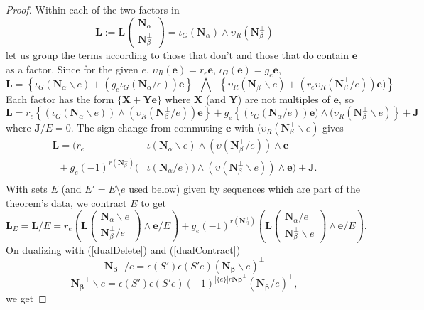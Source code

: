 \documentclass[Unicode]{cedram-alco}
\newcommand{\ext}[1]{\ensuremath{\mathbf{#1}}}
\newcommand{\eNal}{\ensuremath{\ext{N}_{\alpha}}}
\newcommand{\eNbePe}{\ensuremath{\ext{N}_{\beta}^{\perp}}}
\newcommand{\Is}{\ensuremath{\iota}}
\newcommand{\Vs}{\ensuremath{\upsilon}}
\begin{document}
\begin{proof}
Within each of the two factors in
  \[
   \ext{L} := \ext{L}\left( \begin{array}{c} \eNal\\ \eNbePe \end{array} \right)
=\Is_G(\eNal)\wedge\Vs_R(\eNbePe)
  \]
let us group the terms according to those that don't and those that do
contain $\ext{e}$ as a factor.   Since for the given $e$, 
  $\Vs_R(\ext{e})=r_e\ext{e}$, $\Is_G(\ext{e})=g_e\ext{e}$,
\[
\ext{L} =
\left\{\Is_G(\eNal \backslash e) + (g_e\Is_G(\eNal/e))\ext{e}\right\}
\;\;\bigwedge\;\;
\left\{\Vs_R(\eNbePe\backslash e) + (r_e\Vs_R(\eNbePe/e))\ext{e})\right\}  
\]
Each factor has the form $\{\ext{X} + \ext{Y}\ext{e}\}$ where
$\ext{X}$ (and $\ext{Y}$) are not multiples of $\ext{e}$, so
\[
\ext{L}=
r_e\left\{ (\Is_G(\eNal\backslash e))\wedge (\Vs_R(\eNbePe/e))\ext{e} \right\}  +
g_e\left\{ (\Is_G(\eNal/e))\ext{e})  \wedge (\Vs_R(\eNbePe\backslash e)\right\}
+\ext{J}
\]
where $\ext{J}/E = 0$.
The sign change from commuting $\ext{e}$ with $(\Vs_R(\eNbePe\backslash e)$ gives
\[
\begin{split} 
   \ext{L} = \Big( r_e  \;\;\; \;\;\;\;\;\;\;\;\;\;\;\;\;\; & \Is(\eNal\backslash e)  \wedge (\Vs(\eNbePe/e))      \wedge  \ext{e} \\
   \;\;+ g_e (-1)^{r(\eNbePe)} ( & \Is(\eNal/e))\wedge(\Vs(\eNbePe\backslash e))   \wedge  \ext{e}\Big)
+\ext{J}.\\
\end{split}
\]
With sets $E$ (and $E'=E\setminus e$ used below) given by sequences
which are part of the theorem's data, we contract $E$ to get
\[
\ext{L}_E=\ext{L}/E = r_e\left(\ext{L}\left(\begin{array}{c} \eNal\backslash e \\
    \eNbePe/e  \end{array} \right)  \wedge \ext{e} /E \right) +
   g_e(-1)^{r(\eNbePe)}\left(\ext{L}\left(\begin{array}{c} \eNal /e \\
    \eNbePe \backslash e \end{array} \right) \wedge \ext{e} /E \right).
   \]
On dualizing with (\ref{dualDelete}) and (\ref{dualContract})
   \[
     \ext{N_\beta}^\perp/e  = \epsilon(S')\epsilon(S'e) (\ext{N_\beta}\backslash e)^\perp
     \]
     \[
       \ext{N_\beta}^\perp\backslash e = \epsilon(S')\epsilon(S'e)(-1)^{|\{e\}|r\ext{N\beta}^\perp}(\ext{N_\beta}/e)^\perp,
       \]
we get

\end{proof}
\end{document}
